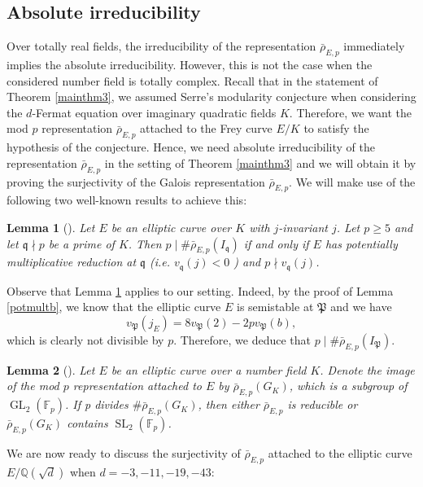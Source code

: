 \documentclass[]{article}
\newtheorem{lemma}{Lemma}
\newcommand {\QQ}{{\mathbb{Q}}}
\newcommand {\mfp}{{\mathfrak{P}}}
\begin{document}
\subsection{Absolute irreducibility}
Over totally real fields, the irreducibility of the representation $\bar{\rho}_{E, p}$ immediately implies the absolute irreducibility. However, this is not the case when the considered number field is totally complex. Recall that in the statement of Theorem \ref{mainthm3}, we assumed Serre's modularity conjecture when considering the $d$-Fermat equation over imaginary quadratic fields $K$. Therefore, we want the mod $p$ representation $\bar{\rho}_{E, p}$ attached to the Frey curve $E/K$ to satisfy the hypothesis of the conjecture. Hence, we need absolute irreducibility of the representation $\bar{\rho}_{E, p}$ in the setting of Theorem \ref{mainthm3} and we will obtain it by proving the surjectivity of the Galois representation $\bar{\rho}_{E, p}$. We will make use of the following two well-known results to achieve this:

\begin{lemma}[{\cite[Lemma 3.4]{freitas2015asymptotic}}]\label{divinertia}
Let $E$ be an elliptic curve over $K$ with $j$-invariant $j$. Let $p \geq 5$ and let $\mathfrak{q} \nmid p$ be a prime of $K$. Then $p \mid \# \bar{\rho}_{E, p}\left(I_{\mathfrak{q}}\right)$ if and only if $E$ has potentially multiplicative reduction at $\mathfrak{q}$ (i.e. $v_{\mathfrak{q}}(j)<0$ ) and $p \nmid v_{\mathfrak{q}}(j)$.    
\end{lemma}

Observe that Lemma \ref{divinertia} applies to our setting. Indeed, by the proof of Lemma \ref{potmultb}, we know that the elliptic curve $E$ is semistable at $\mfp$ and we have $$v_{\mfp}(j_E)=8v_{\mfp}(2)-2pv_{\mfp}(b),$$which is clearly not divisible by $p$. Therefore, we deduce that $p \mid \# \bar{\rho}_{E, p}(I_{\mfp})$.

\begin{lemma}[{\cite[Lemma 2, p.12]{swinnerton1973modular}}]\label{irredsubg}
Let $E$ be an elliptic curve over a number field $K$. Denote the image of the mod $p$ representation attached to $E$ by $\bar{\rho}_{E, p}(G_K)$, which is a subgroup of $\operatorname{GL}_2(\mathbb{F}_p)$. If p divides $\#\bar{\rho}_{E, p}(G_K)$, then either $\bar{\rho}_{E, p}$ is reducible or $\bar{\rho}_{E, p}(G_K)$ contains $\operatorname{SL}_2(\mathbb{F}_p)$.
\end{lemma}

We are now ready to discuss the surjectivity of $\bar{\rho}_{E, p}$ attached to the elliptic curve $E/\QQ(\sqrt{d})$ when $d=-3,-11,-19,-43$:
\end{document}
